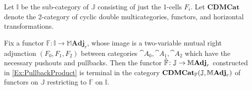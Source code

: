 
Let $\mathbb{I}$ be the sub-category of $\mathbb{J}$ consisting of just the 1-cells $F_i$. Let $\mathbf{CDMCat}$ denote the 2-category of cyclic double multicategories, functors, and horizontal transformations.

\begin{theorem}\label{Thm:MAdjArrowObjects}
	Fix a functor $\mathbb{F}\colon\mathbb{I}\to\mathbb{M}\mathbf{Adj}_r$, whose image is a two-variable mutual right adjunction $(F_0,F_1,F_2)$ between categories $\cat{A}_0,\cat{A}_1,\cat{A}_2$ which have the necessary pushouts and pullbacks. Then the functor $\hat{\mathbb{F}}\colon\mathbb{J}\to\mathbb{M}\mathbf{Adj}_r$ constructed in \cref{Ex:PullbackProduct} is terminal in the category $\mathbf{CDMCat}_{\mathbb{F}}(\mathbb{J},\mathbb{M}\mathbf{Adj}_r)$ of functors on $\mathbb{J}$ restricting to $\mathbb{F}$ on $\mathbb{I}$.
\end{theorem}
